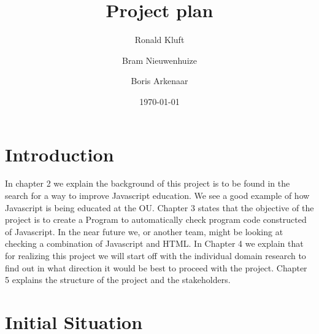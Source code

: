 \documentclass{article}
\begin{document}
\title{Project plan}
\author{Ronald Kluft \and Bram Nieuwenhuize \and Boris Arkenaar}
\date{\today}
\maketitle

\section{Introduction}



In chapter 2 we explain the background of this project is to be found in the search for a way to improve Javascript education. We see a good example of how Javascript is being educated at the OU. Chapter 3 states that the objective of the project is to create a Program to automatically check program code constructed of Javascript. In the near future we, or another team, might be looking at checking a combination of Javascript and HTML.
In Chapter 4 we explain that for realizing this project we will start off with the individual domain research to find out in what direction it would be best to proceed with the project. Chapter 5 explains the structure of the project and the stakeholders.

\section{Initial Situation}
\end{document}
